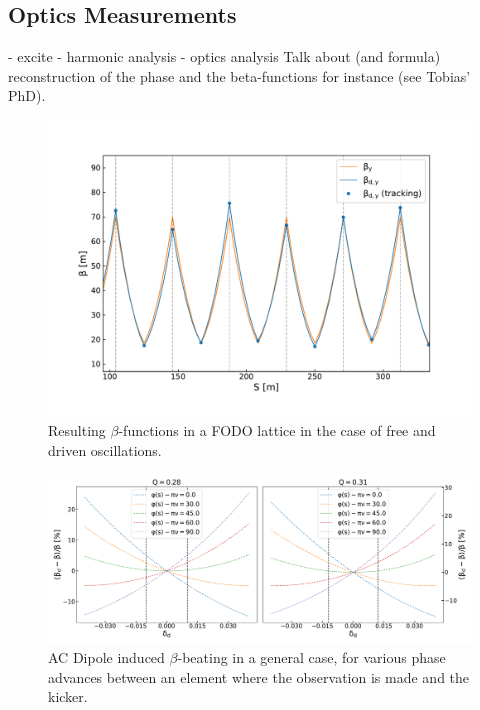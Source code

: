 \subsection{Optics Measurements}
\label{subsection:optics_measurements}

- excite
- harmonic analysis
- optics analysis
Talk about (and formula) reconstruction of the phase and the beta-functions for instance (see Tobias' PhD).

\begin{figure}[!htb]
  \centering
  \includegraphics*[width=0.9\linewidth]{Figures/Optics_Measurements_Corrections_at_LHC/betas_nominal_vs_driven.pdf}
  \caption{Resulting \(\beta\)-functions in a FODO lattice in the case of free and driven oscillations.}
  \label{figure:acdipole_beta_functions_vs_nominal}
\end{figure}

\begin{figure}[!htb]
  \centering
  \includegraphics*[width=0.99\linewidth]{Figures/Optics_Measurements_Corrections_at_LHC/bbeatings_acdipole.pdf}
  \caption{AC Dipole induced \(\beta\)-beating in a general case, for various phase advances between an element where the observation is made and the kicker.}
  \label{figure:ac_dipole_induced_beta_beating}
\end{figure}

